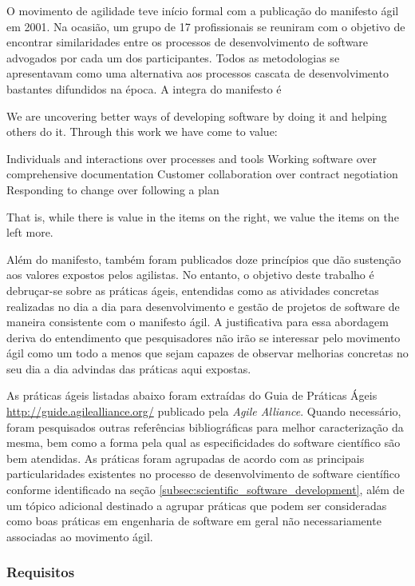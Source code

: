 \documentclass[
	article,			%
	11pt,				%
	oneside,			%
	a4paper,			%
	english,			%
	brazil,				%
	sumario=tradicional
	]{abntex2}
\begin{document}
O movimento de agilidade teve início formal com a publicação do manifesto ágil em 2001. Na ocasião, um grupo de 17 profissionais se reuniram com o objetivo de encontrar similaridades entre os processos de desenvolvimento de software advogados por cada um dos participantes. Todos as metodologias se apresentavam como uma alternativa aos processos cascata de desenvolvimento bastantes difundidos na época. A integra do manifesto é

\begin{citacao}
We are uncovering better ways of developing software by doing it and helping others do it. Through this work we have come to value:

Individuals and interactions over processes and tools
Working software over comprehensive documentation
Customer collaboration over contract negotiation
Responding to change over following a plan

That is, while there is value in the items on the right, we value the items on the left more.
\end{citacao}

Além do manifesto, também foram publicados doze princípios que dão sustenção aos valores expostos pelos agilistas. No entanto, o objetivo deste trabalho é debruçar-se sobre as práticas ágeis, entendidas como as atividades concretas realizadas no dia a dia para desenvolvimento e gestão de projetos de software de maneira consistente com o manifesto ágil. A justificativa para essa abordagem deriva do entendimento que pesquisadores não irão se interessar pelo movimento ágil como um todo a menos que sejam capazes de observar melhorias concretas no seu dia a dia advindas das práticas aqui expostas.

As práticas ágeis listadas abaixo foram extraídas do Guia de Práticas Ágeis \url{http://guide.agilealliance.org/} publicado pela \emph{Agile Alliance}. Quando necessário, foram pesquisados outras referências bibliográficas para melhor caracterização da mesma, bem como a forma pela qual as especificidades do software científico são bem atendidas. As práticas foram agrupadas de acordo com as principais particularidades existentes no processo de desenvolvimento de software científico conforme identificado na seção \ref{subsec:scientific_software_development}, além de um tópico adicional destinado a agrupar práticas que podem ser consideradas como boas práticas em engenharia de software em geral não necessariamente associadas ao movimento ágil.

\subsubsection*{Requisitos}
\end{document}
